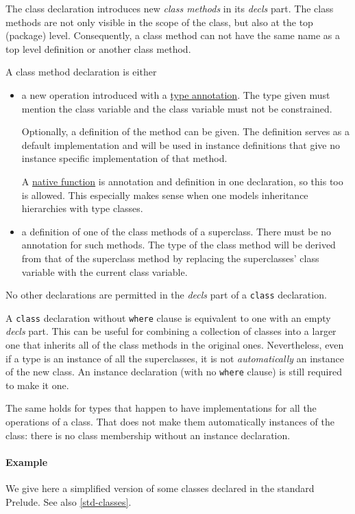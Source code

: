 The class declaration introduces new \emph{class methods} in its \emph{decls} part.
The class methods are not only visible in the scope of the class, but also at the top (package) level.
Consequently, a class method can not have the same name as a top level definition or another class method.

A class method declaration is either

\begin{itemize}
\item a new operation introduced with a \hyperref[annotation]{type annotation}. The type given must mention the class variable and the class variable must not be constrained.

Optionally, a definition of the method can be given. The definition serves as a default implementation and will be used in instance definitions that give no instance specific implementation of that method.

A \hyperref[nativefun]{native function} is annotation and definition in one declaration, so this too is allowed. This especially makes sense when one models \java{} inheritance hierarchies with type classes.

\item a definition of one of the class methods of a superclass. There must be no annotation for such methods. The type of the class method will be derived from that of the superclass method by replacing the superclasses' class variable with the current class variable.
\end{itemize}

No other declarations are permitted in the \emph{decls} part of a \texttt{class} declaration.

A \texttt{class} declaration without \texttt{where} clause is equivalent to one with an empty \emph{decls} part.
This can be useful for combining a collection of classes into a larger one that inherits all of the class methods in the original ones.
Nevertheless, even if a type is an instance of all the superclasses, it is not \emph{automatically} an instance of the new class. An instance declaration (with no \texttt{where} clause) is still required to make it one.

The same holds for types that happen to have implementations for all the operations of  a class. That does not make them automatically instances of the class: there is no class membership without an instance declaration.

\paragraph*{Example} We give here a simplified version of some classes declared in the standard Prelude.
See also \autoref{std-classes}.

